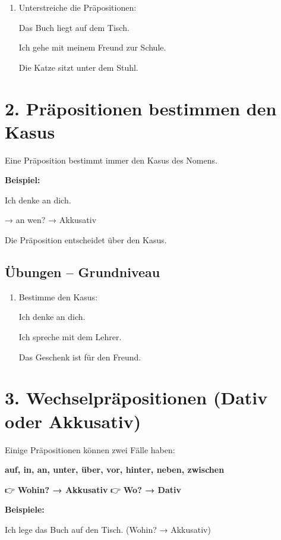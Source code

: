 \documentclass[a4paper,12pt]{article}
\begin{document}
\begin{enumerate}
\item Unterstreiche die Präpositionen:

Das Buch liegt auf dem Tisch.

Ich gehe mit meinem Freund zur Schule.

Die Katze sitzt unter dem Stuhl.
\end{enumerate}

\section*{2. Präpositionen bestimmen den Kasus}

Eine Präposition bestimmt immer den Kasus des Nomens.

\textbf{Beispiel:}

Ich denke an dich.  

→ an wen? → Akkusativ  

\begin{merksatz}
Die Präposition entscheidet über den Kasus.
\end{merksatz}

\subsection*{Übungen – Grundniveau}

\begin{enumerate}
\item Bestimme den Kasus:

Ich denke an dich.

Ich spreche mit dem Lehrer.

Das Geschenk ist für den Freund.
\end{enumerate}

\section*{3. Wechselpräpositionen (Dativ oder Akkusativ)}

Einige Präpositionen können zwei Fälle haben:

\textbf{auf, in, an, unter, über, vor, hinter, neben, zwischen}

👉 \textbf{Wohin? → Akkusativ}  
👉 \textbf{Wo? → Dativ}

\textbf{Beispiele:}

Ich lege das Buch auf den Tisch. (Wohin? → Akkusativ)
\end{document}
